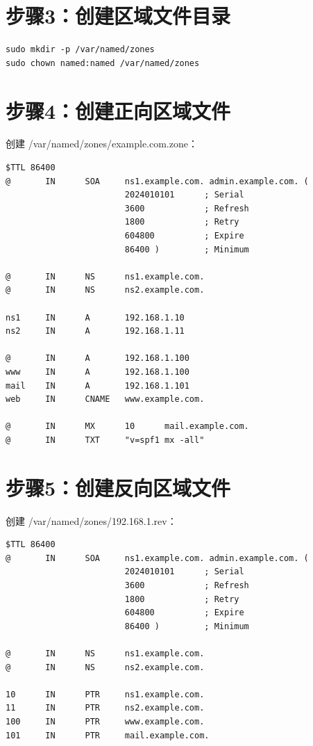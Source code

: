 \documentclass[12pt,UTF8]{ctexbook}
\begin{document}
\section{步骤3：创建区域文件目录}
\label{sec:practice_step3}

\begin{verbatim}
sudo mkdir -p /var/named/zones
sudo chown named:named /var/named/zones
\end{verbatim}

\section{步骤4：创建正向区域文件}
\label{sec:practice_step4}

创建 /var/named/zones/example.com.zone：
\begin{verbatim}
$TTL 86400
@       IN      SOA     ns1.example.com. admin.example.com. (
                        2024010101      ; Serial
                        3600            ; Refresh
                        1800            ; Retry
                        604800          ; Expire
                        86400 )         ; Minimum

@       IN      NS      ns1.example.com.
@       IN      NS      ns2.example.com.

ns1     IN      A       192.168.1.10
ns2     IN      A       192.168.1.11

@       IN      A       192.168.1.100
www     IN      A       192.168.1.100
mail    IN      A       192.168.1.101
web     IN      CNAME   www.example.com.

@       IN      MX      10      mail.example.com.
@       IN      TXT     "v=spf1 mx -all"
\end{verbatim}

\section{步骤5：创建反向区域文件}
\label{sec:practice_step5}

创建 /var/named/zones/192.168.1.rev：
\begin{verbatim}
$TTL 86400
@       IN      SOA     ns1.example.com. admin.example.com. (
                        2024010101      ; Serial
                        3600            ; Refresh
                        1800            ; Retry
                        604800          ; Expire
                        86400 )         ; Minimum

@       IN      NS      ns1.example.com.
@       IN      NS      ns2.example.com.

10      IN      PTR     ns1.example.com.
11      IN      PTR     ns2.example.com.
100     IN      PTR     www.example.com.
101     IN      PTR     mail.example.com.
\end{verbatim}
\end{document}
